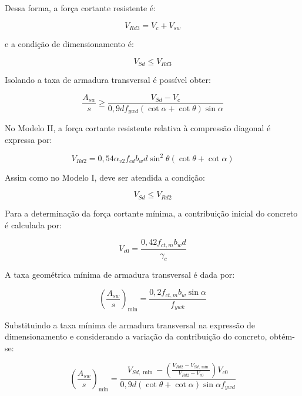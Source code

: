 Dessa forma, a força cortante resistente é:

\begin{equation}
V_{Rd3} = V_{c} + V_{sw}
\end{equation}

e a condição de dimensionamento é:

\begin{equation}
V_{Sd} \leq V_{Rd3}
\end{equation}

Isolando a taxa de armadura transversal é possível obter:

\begin{equation}
\frac{A_{sw}}{s} \geq
\frac{V_{Sd}-V_{c}}
{0,9d f_{ywd}(\cot\alpha+\cot\theta)\sin\alpha}
\end{equation}

No Modelo II, a força cortante resistente relativa à compressão diagonal é expressa por:

\begin{equation}
V_{Rd2} =
0,54\alpha_{v2}f_{cd}b_wd
\sin^2\theta
(\cot\theta+\cot\alpha)
\end{equation}

Assim como no Modelo I, deve ser atendida a condição:

\begin{equation}
V_{Sd} \leq V_{Rd2}
\end{equation}

Para a determinação da força cortante mínima, a contribuição inicial do concreto é calculada por:

\begin{equation}
V_{c0} =
\frac{0,42f_{ct,m}b_wd}{\gamma_c}
\end{equation}

A taxa geométrica mínima de armadura transversal é dada por:

\begin{equation}
\left(\frac{A_{sw}}{s}\right)_{\min} =
\frac{0,2f_{ct,m}b_w\sin\alpha}{f_{ywk}}
\end{equation}

Substituindo a taxa mínima de armadura transversal na expressão de dimensionamento e considerando a variação da contribuição do concreto, obtém-se:

\begin{equation}
\left(\frac{A_{sw}}{s}\right)_{\min} =
\frac{
V_{Sd,\min}-
\left(
\frac{V_{Rd2}-V_{Sd,\min}}
{V_{Rd2}-V_{c0}}
\right)V_{c0}
}{
0,9d(\cot\theta+\cot\alpha)
\sin\alpha f_{ywd}
}
\end{equation}

